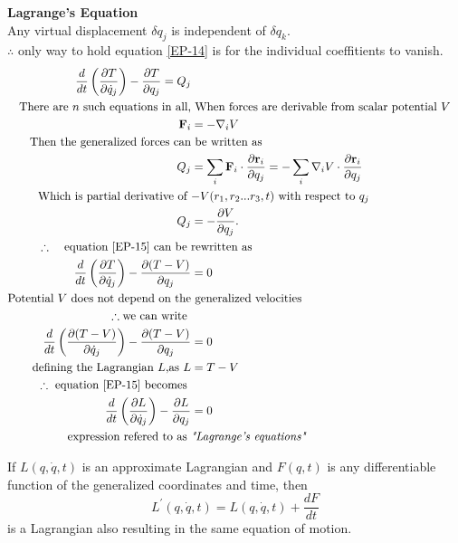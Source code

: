 \textbf{Lagrange's Equation}\\
Any virtual displacement $\delta q_j$ is independent of $\delta q_k.$\\
$\therefore$ \quad only way to hold equation \ref{EP-14} is for the individual coeffitients to vanish.
\begin{align}
\frac{d}{d t}\left(\frac{\partial T}{\partial \dot{q}_{j}}\right)-\frac{\partial T}{\partial q_{j}}=Q_{j}\label{EP-15}\\
\text{There are $n$ such equations in all,}&\text{ When forces are derivable from scalar potential $V$}\notag\\
\mathbf{F}_{i}&=-\nabla_{i} V\notag\\
\text{Then the generalized forces can}&\text{ be written as}\notag\\
Q_{j}&=\sum_{i} \mathbf{F}_{i} \cdot \frac{\partial \mathbf{r}_{i}}{\partial q_{j}}=-\sum_{i} \nabla_{i} V \cdot \frac{\partial \mathbf{r}_{i}}{\partial q_{j}}\notag\\
\text{Which is partial derivative of }&\text{$-V(r_1,r_2...r_3,t)$ with respect to $q_j$}\notag\\
Q_{j}&=-\frac{\partial V}{\partial q_{j}} .\label{EP-16}\\
\text{$\therefore$ \quad equation \ref{EP-15} can be }&\text{rewritten as}\notag\\
\frac{d}{d t}\left(\frac{\partial T}{\partial \dot{q}_{j}}\right)-\frac{\partial (T-V)}{\partial q_{j}}&=0\\
\text{Potential $V$ does not depend on the}&\text{ generalized velocities }\notag\\
\therefore \text{we can write }\notag\\
\frac{d}{d t}\left( \frac{\partial (T-V)}{\partial \dot{q}_{j}} \right)  -\frac{\partial (T-V)}{\partial q_{j}}&=0\notag\\
\text{defining the Lagrangian $L$,as }L&=T-V\notag\\
\therefore \text{ equation \ref{EP-15} becomes }&\notag\\
\frac{d}{d t}\left(\frac{\partial L}{\partial \dot{q}_{j}}\right)-\frac{\partial L}{\partial q_{j}}&=0\notag\\
\text{expression refered to as }&\textit{"Lagrange's equations"}\notag
\end{align}
\begin{note}
	If $L(q,\dot{q},t)$ is an approximate Lagrangian and $F(q,t)$ is any differentiable function of the generalized coordinates and time, then
	$$L^{\prime}(q, \dot{q}, t)=L(q, \dot{q}, t)+\frac{d F}{d t}$$
	is a Lagrangian also resulting in the same equation of motion.
\end{note}
